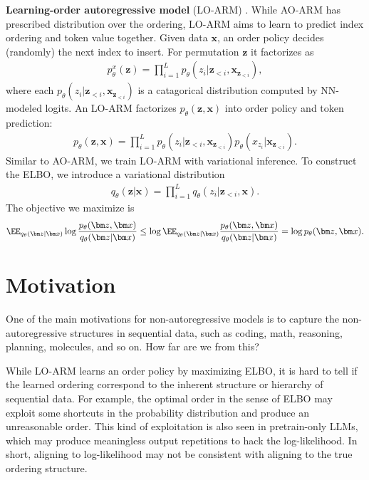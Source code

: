 \textbf{Learning-order autoregressive model} (LO-ARM) \citep{wang2025learningorder}. While AO-ARM has prescribed distribution over the ordering, LO-ARM aims to learn to predict index ordering and token value together. Given data $\bm x$, an order policy decides (randomly) the next index to insert. For permutation $\bm z$ it factorizes as
\begin{align*}
    p_\theta^x(\bm z)=\prod_{i=1}^Lp_\theta(z_i|\bm z_{<i}, \bm x_{\bm z_{<i}}),
\end{align*}
where each $p_\theta(z_i|\bm z_{<i},\bm x_{\bm z_{<i}})$ is a catagorical distribution computed by NN-modeled logits. An LO-ARM factorizes $p_\theta(\bm z,\bm x)$ into order policy and token prediction:
\begin{align*}
    p_\theta(\bm z,\bm x)=\prod_{i=1}^Lp_\theta(z_i|\bm z_{<i},\bm x_{\bm z_{<i}})p_\theta(x_{z_i}|\bm x_{\bm z_{<i}}).
\end{align*}
Similar to AO-ARM, we train LO-ARM with variational inference. To construct the ELBO, we introduce a variational distribution
\begin{align*}
    q_\theta(\bm z|\bm x)=\prod_{i=1}^Lq_\theta(z_i|\bm z_{<i},\bm x).
\end{align*}
The objective we maximize is
\begin{align*}
    \EE_{q_\theta(\bm z|\bm x)}\log\frac{p_\theta(\bm z,\bm x)}{q_\theta(\bm z|\bm x)}\leq\log\EE_{q_\theta(\bm z|\bm x)}\frac{p_\theta(\bm z,\bm x)}{q_\theta(\bm z|\bm x)}=\log p_\theta(\bm z,\bm x).
\end{align*}

\section{Motivation}
One of the main motivations for non-autoregressive models is to capture the non-autoregressive structures in sequential data, such as coding, math, reasoning, planning, molecules, and so on. How far are we from this?

While LO-ARM learns an order policy by maximizing ELBO, it is hard to tell if the learned ordering correspond to the inherent structure or hierarchy of sequential data. For example, the optimal order in the sense of ELBO may exploit some shortcuts in the probability distribution and produce an unreasonable order. This kind of exploitation is also seen in pretrain-only LLMs, which may produce meaningless output repetitions to hack the log-likelihood. In short, aligning to log-likelihood may not be consistent with aligning to the true ordering structure.


